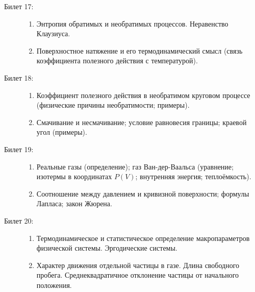 \documentclass{article}
\begin{document}
\begin{description}
\begin{enumerate}
	\end{enumerate}
	\item[Билет 17:]\phantom{}
	\begin{enumerate}
		\item Энтропия обратимых и необратимых процессов.
		Неравенство Клаузиуса.
		\item Поверхностное натяжение и его термодинамический смысл
		(связь коэффициента полезного действия с температурой).
	\end{enumerate}
	\item[Билет 18:]\phantom{}
	\begin{enumerate}
		\item Коэффициент полезного действия в необратимом круговом процессе
		(физические причины необратимости; примеры).
		\item Смачивание и несмачивание; условие равновесия границы;
		краевой угол (примеры).
	\end{enumerate}
	\item[Билет 19:]\phantom{}
	\begin{enumerate}
		\item Реальные газы (определение); газ Ван-дер-Ваальса
		(уравнение; изотермы в координатах $P(V)$; внутренняя энергия;
		теплоёмкость).
		\item Соотношение между давлением и кривизной поверхности;
		формулы Лапласа; закон Жюрена.
	\end{enumerate}
	\item[Билет 20:]\phantom{}
	\begin{enumerate}
		\item Термодинамическое и статистическое определение
		макропараметров физической системы. Эргодические системы.
		\item Характер движения отдельной частицы в газе.
		Длина свободного пробега. Среднеквадратичное отклонение
		частицы от начального положения.
	\end{enumerate}
\end{description}
\end{document}
